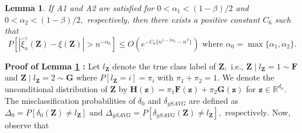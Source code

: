 \documentclass[twoside]{article}
\newcommand{\bZ}{\mathbf{Z}}
\newcommand{\bF}{\mathbf{F}}
\newcommand{\bG}{\mathbf{G}}
\newcommand{\bH}{\mathbf{H}}
\newcommand{\bz}{\mathbf{z}}
\newcommand{\0}{\mathbf{0}}
\newcommand{\1}{\mathbf{1}}
\numberwithin{equation}{section}
\newtheorem{lemma}[thm]{Lemma}
\begin{document}
\begin{lemma}\label{asconv}
If A1 and A2 are satisfied for $0<\alpha_1<(1-\beta)/2$ and $0<\alpha_2<(1-\beta)/2,$ respectively, then there exists a positive constant $C_6$ such that  $$P[|\hat{\xi}^\gamma_n(\bZ)-\xi(\bZ)|>n^{-\alpha_0}]\leq O(e^{-C_6\{n^{1-2\alpha_0}-n^{\beta}\}})\text{ where }\alpha_0=\max\{\alpha_1,\alpha_2\}.$$
\end{lemma}
{\bf Proof of Lemma \ref{asconv} :}
 Let $l_{\bZ}$ denote the true class label of $\bZ,$ i.e., $\bZ\mid l_{\bZ}=1\sim\bF$ and $\bZ\mid l_{\bZ}=2\sim\bG$ where $P[l_{\bZ}=i]=\pi_i$ with $\pi_1+\pi_2=1.$ We denote the unconditional distribution of $\bZ$ by $\bH(\bz) = \pi_1\bF(\bz) + \pi_2\bG(\bz)$ for $\bz\in\mathbb{R}^{d_n}.$ The misclassification probabilities of $\delta_{0}$ and $\delta_{gSAVG}$ are defined as $\Delta_0 = P[\delta_{0}(\bZ)\neq l_{\bZ}]\text{ and } \Delta_{gSAVG} = P[\delta_{gSAVG}(\bZ)\neq l_{\bZ}],\text{ respectively.}$ Now, observe that %
\end{document}
